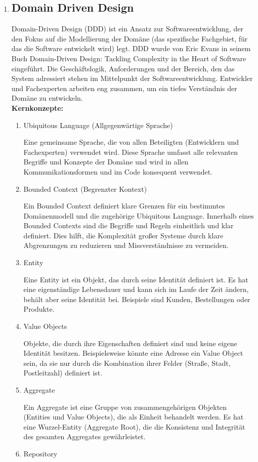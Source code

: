 \documentclass{article}
\begin{document}
\begin{enumerate}[label=\alph*)]
\newpage 
{}
   \item \subsection*{Domain Driven Design}
   Domain-Driven Design (DDD) ist ein Ansatz zur Softwareentwicklung, der den Fokus auf die Modellierung der Domäne (das spezifische Fachgebiet, für das die Software entwickelt wird) legt. DDD wurde von Eric Evans in seinem Buch Domain-Driven Design: Tackling Complexity in the Heart of Software eingeführt.
Die Geschäftslogik, Anforderungen und der Bereich, den das System adressiert stehen im Mittelpunkt der Softwareentwicklung. Entwickler und Fachexperten arbeiten eng zusammen, um ein tiefes Verständnis der Domäne zu entwickeln.\\
\textbf{Kernkonzepte:}
\begin{enumerate}[label=\arabic*)]
\item Ubiquitous Language (Allgegenwärtige Sprache)

Eine gemeinsame Sprache, die von allen Beteiligten (Entwicklern und Fachexperten) verwendet wird. Diese Sprache umfasst alle relevanten Begriffe und Konzepte der Domäne und wird in allen Kommunikationsformen und im Code konsequent verwendet.
\item Bounded Context (Begrenzter Kontext)

Ein Bounded Context definiert klare Grenzen für ein bestimmtes Domänenmodell und die zugehörige Ubiquitous Language. Innerhalb eines Bounded Contexts sind die Begriffe und Regeln einheitlich und klar definiert. Dies hilft, die Komplexität großer Systeme durch klare Abgrenzungen zu reduzieren und Missverständnisse zu vermeiden. 
\item Entity

Eine Entity ist ein Objekt, das durch seine Identität definiert ist. Es hat eine eigenständige Lebensdauer und kann sich im Laufe der Zeit ändern, behält aber seine Identität bei. Beispiele sind Kunden, Bestellungen oder Produkte.
\item Value Objects

Objekte, die durch ihre Eigenschaften definiert sind und keine eigene Identität besitzen. Beispielsweise könnte eine Adresse ein Value Object sein, da sie nur durch die Kombination ihrer Felder (Straße, Stadt, Postleitzahl) definiert ist.
\item Aggregate

Ein Aggregate ist eine Gruppe von zusammengehörigen Objekten (Entities und Value Objects), die als Einheit behandelt werden. Es hat eine Wurzel-Entity (Aggregate Root), die die Konsistenz und Integrität des gesamten Aggregates gewährleistet.
\item Repository


\end{enumerate}
\end{enumerate}
\end{document}
